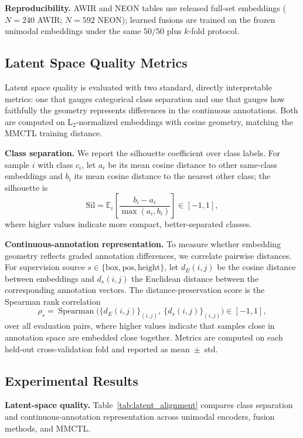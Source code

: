 \documentclass[10pt,twocolumn,letterpaper]{article}
\newcommand{\new}[1]{#1}
\begin{document}
\new{\noindent\textbf{Reproducibility.} AWIR and NEON tables use released full-set embeddings ($N{=}240$ AWIR; $N{=}592$ NEON); learned fusions are trained on the frozen unimodal embeddings under the same $50/50$ plus $k$-fold protocol.}

\subsection{Latent Space Quality Metrics}
\label{sec:latent_space_quality_metrics}
{
Latent space quality is evaluated with two standard, directly interpretable metrics: one that gauges categorical class separation and one that gauges how faithfully the geometry represents differences in the continuous annotations. Both are computed on L$_2$-normalized embeddings with cosine geometry, matching the MMCTL training distance.

\noindent\textbf{Class separation.}
We report the silhouette coefficient over class labels. For sample $i$ with class $c_i$, let $a_i$ be its mean cosine distance to other same-class embeddings and $b_i$ its mean cosine distance to the nearest other class; the silhouette is
\begin{equation}
\label{eq:silhouette}
\mathrm{Sil}
=
\mathbb{E}_i\!\left[
\frac{b_i - a_i}{\max(a_i, b_i)}
\right]
\in [-1, 1],
\end{equation}
where higher values indicate more compact, better-separated classes.

\noindent\textbf{Continuous-annotation representation.}
To measure whether embedding geometry reflects graded annotation differences, we correlate pairwise distances. For supervision source $s \in \{\mathrm{box}, \mathrm{pos}, \mathrm{height}\}$, let $d_E(i,j)$ be the cosine distance between embeddings and $d_s(i,j)$ the Euclidean distance between the corresponding annotation vectors. The distance-preservation score is the Spearman rank correlation
\begin{equation}
\label{eq:spearman}
\rho_s
=
\operatorname{Spearman}\big(
\{ d_E(i,j) \}_{(i,j)},\
\{ d_s(i,j) \}_{(i,j)}
\big)
\in [-1, 1],
\end{equation}
over all evaluation pairs, where higher values indicate that samples close in annotation space are embedded close together. Metrics are computed on each held-out cross-validation fold and reported as mean~$\pm$~std.
}


\subsection{Experimental Results}
\label{subsec:experimental-results}
\new{\noindent\textbf{Latent-space quality.} Table~\ref{tab:latent_alignment} compares class separation and continuous-annotation representation across unimodal encoders, fusion methods, and MMCTL.}
\end{document}
